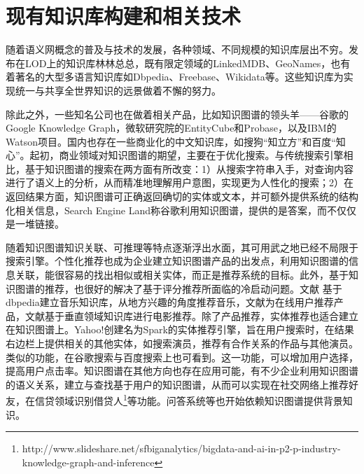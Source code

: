 \section{现有知识库构建和相关技术}
\label{sec:knowledgebase-research}

随着语义网概念的普及与技术的发展，各种领域、不同规模的知识库层出不穷。发布在LOD上的知识库林林总总，既有限定领域的LinkedMDB\cite{erxleben2014introducing}、GeoNames\cite{wick2011geonames}，也有着著名的大型多语言知识库如Dbpedia、Freebase、Wikidata等。这些知识库为实现统一与共享全世界知识的远景做着不懈的努力。

除此之外，一些知名公司也在做着相关产品，比如知识图谱的领头羊——谷歌的Google Knowledge Graph\cite{singhal2012introducing}，微软研究院的EntityCube\cite{nie2012statistical}和Probase\cite{wu2012probase}，以及IBM的Watson项目\cite{ferrucci2012introduction}。国内也存在一些商业化的中文知识库，如搜狗“知立方”和百度“知心”。起初，商业领域对知识图谱的期望，主要在于优化搜索。与传统搜索引擎相比，基于知识图谱的搜索在两方面有所改变：1）从搜索字符串入手，对查询内容进行了语义上的分析，从而精准地理解用户意图，实现更为人性化的搜索；2）在返回结果方面，知识图谱可正确返回确切的实体或文本，并可额外提供系统的结构化相关信息，Search Engine Land称谷歌利用知识图谱，提供的是答案，而不仅仅是一堆链接\cite{sullivan2012google}。

随着知识图谱知识关联、可推理等特点逐渐浮出水面，其可用武之地已经不局限于搜索引擎。个性化推荐也成为企业建立知识图谱产品的出发点\cite{Burke00knowledge,aggarwal2016knowledge}，利用知识图谱的信息关联，能很容易的找出相似或相关实体，而正是推荐系统的目标。此外，基于知识图谱的推荐，也很好的解决了基于评分推荐所面临的冷启动问题。文献\cite{passant2010dbrec,kaminskas2012knowledge} 基于dbpedia建立音乐知识库，从地方兴趣的角度推荐音乐，文献\cite{jiang2005multimedia}为在线用户推荐产品，文献\cite{cheekula2015entity}基于垂直领域知识库进行电影推荐。除了产品推荐，实体推荐也适合建立在知识图谱上。Yahoo!创建名为Spark的实体推荐引擎\cite{blanco2013entity}，旨在用户搜索时，在结果右边栏上提供相关的其他实体，如搜索演员，推荐有合作关系的作品与其他演员。类似的功能，在谷歌搜索与百度搜索上也可看到。这一功能，可以增加用户选择，提高用户点击率。知识图谱在其他方向也存在应用可能，有不少企业利用知识图谱的语义关系，建立与查找基于用户的知识图谱，从而可以实现在社交网络上推荐好友\cite{venkataramani2012tao}，在信贷领域识别借贷人\footnote{http://www.slideshare.net/sfbiganalytics/bigdata-and-ai-in-p2-p-industry-knowledge-graph-and-inference}等功能。问答系统等也开始依赖知识图谱提供背景知识\cite{yih2015semantic,yang2014joint}。

